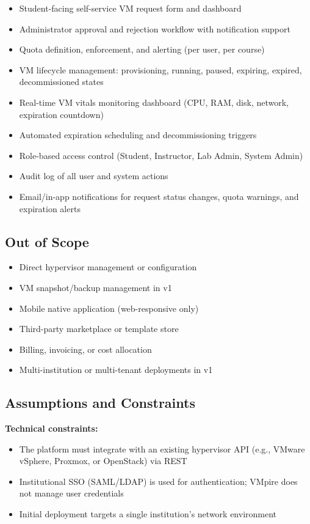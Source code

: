 \documentclass[12pt,letterpaper]{article}
\begin{document}
\begin{itemize}
  \item Student-facing self-service VM request form and dashboard
  \item Administrator approval and rejection workflow with notification support
  \item Quota definition, enforcement, and alerting (per user, per course)
  \item VM lifecycle management: provisioning, running, paused, expiring, expired, decommissioned states
  \item Real-time VM vitals monitoring dashboard (CPU, RAM, disk, network, expiration countdown)
  \item Automated expiration scheduling and decommissioning triggers
  \item Role-based access control (Student, Instructor, Lab Admin, System Admin)
  \item Audit log of all user and system actions
  \item Email/in-app notifications for request status changes, quota warnings, and expiration alerts
\end{itemize}

\subsection{Out of Scope}

\begin{itemize}
  \item Direct hypervisor management or configuration
  \item VM snapshot/backup management in v1
  \item Mobile native application (web-responsive only)
  \item Third-party marketplace or template store
  \item Billing, invoicing, or cost allocation
  \item Multi-institution or multi-tenant deployments in v1
\end{itemize}

\subsection{Assumptions and Constraints}

\textbf{Technical constraints:}
\begin{itemize}
  \item The platform must integrate with an existing hypervisor API (e.g., VMware vSphere, Proxmox, or OpenStack) via REST
  \item Institutional SSO (SAML/LDAP) is used for authentication; VMpire does not manage user credentials
  \item Initial deployment targets a single institution's network environment
\end{itemize}
\end{document}
